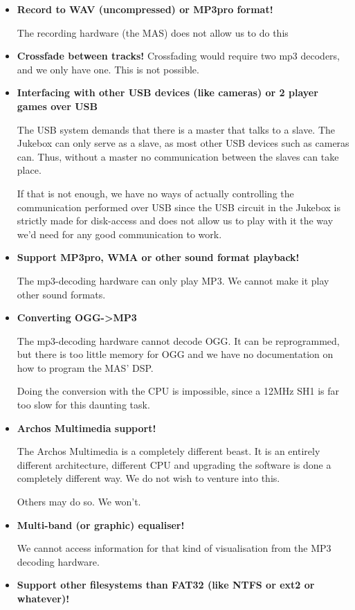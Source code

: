 \begin{itemize}
\item {\bfseries
Record to WAV (uncompressed) or MP3pro format!}

The recording hardware (the MAS) does not allow us to do this
\item {\bfseries
Crossfade between tracks!}
Crossfading would require two mp3 decoders,
and we only have one. This is not possible.
\item {\bfseries
Interfacing with other USB devices (like cameras) or 2 player games over
USB}

The USB system demands that there is a master that talks to a slave. The
Jukebox can only serve as a slave, as most other USB devices such as
cameras can. Thus, without a master no communication between the slaves
can take place.

If that is not enough, we have no ways of actually controlling the
communication performed over USB since the USB circuit in the Jukebox
is strictly made for disk{}-access and does not allow us to play with
it the way we'd need for any good communication to
work.
\item {\bfseries
Support MP3pro, WMA or other sound format playback!}

The mp3{}-decoding hardware can only play MP3. We cannot make it play
other sound formats.
\item {\bfseries
Converting OGG{}-{\textgreater}MP3}

The mp3{}-decoding hardware cannot decode OGG. It can be reprogrammed,
but there is too little memory for OGG and we have no documentation on
how to program the MAS' DSP.

Doing the conversion with the CPU is impossible, since a 12MHz SH1 is
far too slow for this daunting task.
\item {\bfseries
Archos Multimedia support!}

The Archos Multimedia is a completely different beast. It is an entirely
different architecture, different CPU and upgrading the software is
done a completely different way. We do not wish to venture into this. 

Others may do so. We won't.
\item {\bfseries
Multi{}-band (or graphic) equaliser!}

We cannot access information for that kind of visualisation from the MP3
decoding hardware.
\item {\bfseries
Support other filesystems than FAT32 (like
NTFS or ext2 or whatever)!}


\end{itemize}
